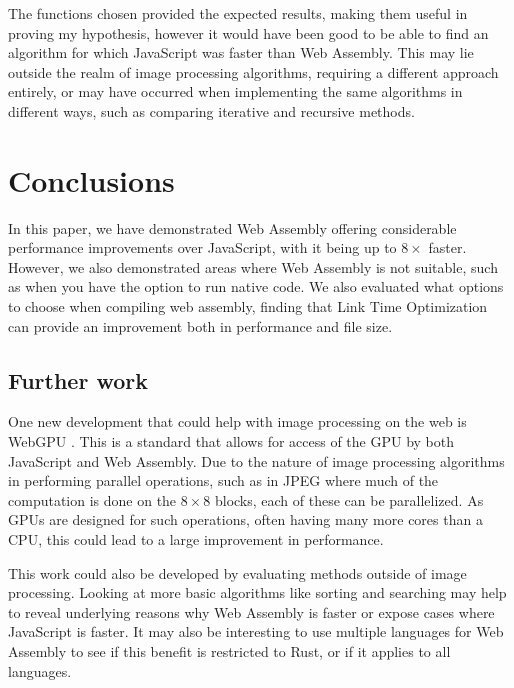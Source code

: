 \documentclass[12pt,a4paper]{article}
\begin{document}
The functions chosen provided the expected results, making them useful in proving my hypothesis, however it would have been good to be able to find an algorithm for which JavaScript was faster than Web Assembly. This may lie outside the realm of image processing algorithms, requiring a different approach entirely, or may have occurred when implementing the same algorithms in different ways, such as comparing iterative and recursive methods.




\section{Conclusions}

In this paper, we have demonstrated Web Assembly offering considerable performance improvements over JavaScript, with it being up to $8\times$ faster. However, we also demonstrated areas where Web Assembly is not suitable, such as when you have the option to run native code. We also evaluated what options to choose when compiling web assembly, finding that Link Time Optimization can provide an improvement both in performance and file size.

\subsection{Further work}

One new development that could help with image processing on the web is WebGPU \cite{webgpu}. This is a standard that allows for access of the GPU by both JavaScript and Web Assembly. Due to the nature of image processing algorithms in performing parallel operations, such as in JPEG where much of the computation is done on the $8\times 8$ blocks, each of these can be parallelized. As GPUs are designed for such operations, often having many more cores than a CPU, this could lead to a large improvement in performance.


This work could also be developed by evaluating methods outside of image processing. Looking at more basic algorithms like sorting and searching may help to reveal underlying reasons why Web Assembly is faster or expose cases where JavaScript is faster.
It may also be interesting to use multiple languages for Web Assembly to see if this benefit is restricted to Rust, or if it applies to all languages.


\newpage

\end{document}
